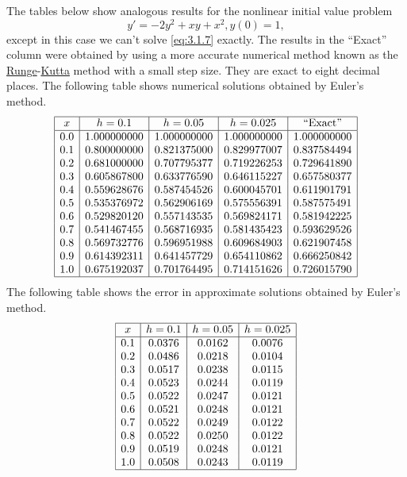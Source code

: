 \documentclass{ximera}
\begin{document}
 
 \begin{example}\label{example:3.1.3}
The tables below show analogous results
for the nonlinear initial value problem
\begin{equation} \label{eq:3.1.7}
y'=-2y^2+xy+x^2, y(0)=1,
\end{equation}
except in this case we can't solve \eqref{eq:3.1.7} exactly.
The results in the ``Exact'' column were obtained by using a
more accurate numerical method known as the
\href{http://www-history.mcs.st-and.ac.uk/Mathematicians/Runge.html}{Runge}-\href{http://www-history.mcs.st-and.ac.uk/Mathematicians/Kutta.html}{Kutta}
method
 with a small step size. They are
exact to eight decimal places.
The following table shows numerical solutions obtained by Euler's method.
$$
\begin{array}{|c|c|c|c|c|}
\hline
x&
h=0.1&
h=0.05&
h=0.025&
\text{``Exact''}\\ \hline
0.0 & 1.000000000 & 1.000000000 & 1.000000000 & 1.000000000 \\
0.1 & 0.800000000 & 0.821375000 & 0.829977007 & 0.837584494 \\
0.2 & 0.681000000 & 0.707795377 & 0.719226253 & 0.729641890 \\
0.3 & 0.605867800 & 0.633776590 & 0.646115227 & 0.657580377 \\
0.4 & 0.559628676 & 0.587454526 & 0.600045701 & 0.611901791 \\
0.5 & 0.535376972 & 0.562906169 & 0.575556391 & 0.587575491 \\
0.6 & 0.529820120 & 0.557143535 & 0.569824171 & 0.581942225 \\
0.7 & 0.541467455 & 0.568716935 & 0.581435423 & 0.593629526 \\
0.8 & 0.569732776 & 0.596951988 & 0.609684903 & 0.621907458 \\
0.9 & 0.614392311 & 0.641457729 & 0.654110862 & 0.666250842 \\
1.0 & 0.675192037 & 0.701764495 & 0.714151626 & 0.726015790\\
\hline
\end{array}
$$
The following table shows the error in approximate solutions obtained by Euler's method.
$$
\begin{array}{|c|c|c|c|}
\hline
x&
h=0.1&
h=0.05&
h=0.025\\ \hline
0.1 & 0.0376 & 0.0162 &0.0076 \\
0.2 & 0.0486 & 0.0218 &0.0104 \\
0.3 & 0.0517 & 0.0238 &0.0115 \\
0.4 & 0.0523 & 0.0244 &0.0119 \\
0.5 & 0.0522 & 0.0247 &0.0121 \\
0.6 & 0.0521 & 0.0248 &0.0121 \\
0.7 & 0.0522 & 0.0249 &0.0122 \\
0.8 & 0.0522 & 0.0250 &0.0122 \\
0.9 & 0.0519 & 0.0248 &0.0121 \\
1.0 & 0.0508 & 0.0243 &0.0119 \\
\hline
\end{array}
$$


\end{example}
\end{document}
